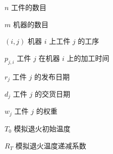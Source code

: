 \begin{denotation}[3cm]
\item[$ n $]  工件的数目
\item[$ m $]  机器的数目
\item[$ (i,j) $] 机器 $ i $ 上工件 $ j $ 的工序
\item[$ p_{j,i} $]  工件 $ j $ 在机器 $ i $ 上的加工时间
\item[$ r_j $]  工件 $ j $ 的发布日期
\item[$ d_j $]  工件 $ j $ 的交货日期
\item[$ w_j $]  工件 $ j $ 的权重
\item[$ T_0 $]  模拟退火初始温度
\item[$ R_T $]  模拟退火温度递减系数

\end{denotation}

